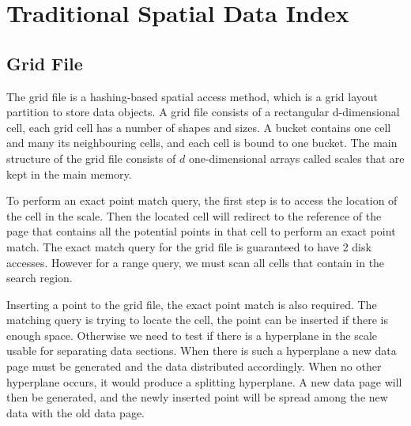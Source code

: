 \section{Traditional Spatial Data Index}






\subsection{Grid File}
The grid file \cite{NievergeltJ:1984kc} is a hashing-based spatial access method, which is a grid layout partition to store data objects. A grid file consists of a rectangular d-dimensional cell, each grid cell has a number of shapes and sizes. A bucket contains one cell and many its neighbouring cells, and each cell is bound to one bucket. The main structure of the grid file consists of $d$ one-dimensional arrays called scales that are kept in the main memory. 


To perform an exact point match query, the first step is to access the location of the cell in the scale. Then the located cell will redirect to the reference of the page that contains all the potential points in that cell to perform an exact point match. The exact match query for the grid file is guaranteed to have 2 disk accesses. However for a range query, we must scan all cells that contain in the search region. 

Inserting a point to the grid file, the exact point match is also required. The matching query is trying to locate the cell, the point can be inserted if there is enough space. Otherwise we need to test if there is a hyperplane in the scale usable for separating data sections. When there is such a hyperplane a new data page must be generated and the data distributed accordingly. When no other hyperplane occurs, it would produce a splitting hyperplane. A new data page will then be generated, and the newly inserted point will be spread among the new data with the old data page. 



